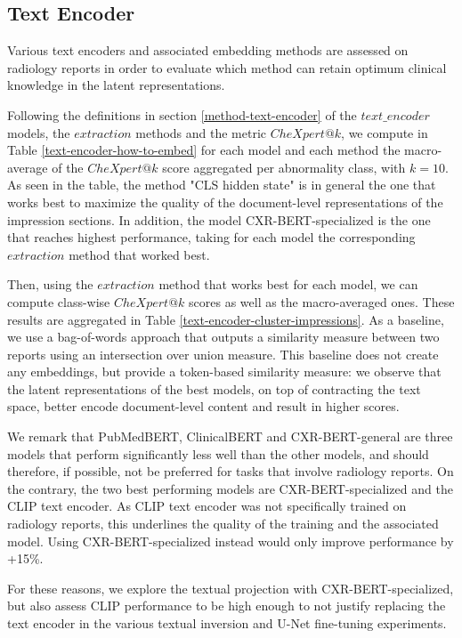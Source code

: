 \documentclass{article}
\begin{document}
\subsection{Text Encoder}

Various text encoders and associated embedding methods are assessed on radiology reports in order to evaluate which method can retain optimum clinical knowledge in the latent representations. 

Following the definitions in section \ref{method-text-encoder} of the $text\_encoder$ models, the $extraction$ methods and the metric $CheXpert@k$, we compute in Table \ref{text-encoder-how-to-embed} for each model and each method the macro-average of the $CheXpert@k$ score aggregated per abnormality class, with $k=10$. As seen in the table, the method "CLS hidden state" is in general the one that works best to maximize the quality of the document-level representations of the impression sections. In addition, the model CXR-BERT-specialized is the one that reaches highest performance, taking for each model the corresponding $extraction$ method that worked best. 

Then, using the $extraction$ method that works best for each model, we can compute class-wise $CheXpert@k$ scores as well as the macro-averaged ones. These results are aggregated in Table \ref{text-encoder-cluster-impressions}. As a baseline, we use a bag-of-words approach that outputs a similarity measure between two reports using an intersection over union measure. This baseline does not create any embeddings, but provide a token-based similarity measure: we observe that the latent representations of the best models, on top of contracting the text space, better encode document-level content and result in higher scores. 

We remark that PubMedBERT, ClinicalBERT and CXR-BERT-general are three models that perform significantly less well than the other models, and should therefore, if possible, not be preferred for tasks that involve radiology reports. On the contrary, the two best performing models are CXR-BERT-specialized and the CLIP text encoder. As CLIP text encoder was not specifically trained on radiology reports, this underlines the quality of the training and the associated model. Using CXR-BERT-specialized instead would only improve performance by +15\%. 

For these reasons, we explore the textual projection with CXR-BERT-specialized, but also assess CLIP performance to be high enough to not justify replacing the text encoder in the various textual inversion and U-Net fine-tuning experiments. 
\end{document}
